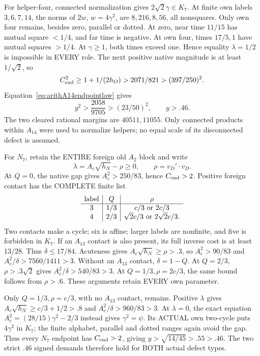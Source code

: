 \documentclass[11pt]{article}
\begin{document}
For helper-four, connected normalization
gives \(2\sqrt2\gamma\in K_7\).
At finite own labels \(3,6,7,14\), the
norms of \(2w\), \(w=4\gamma^2\), are
\(8,216,8,56\), all nonsquares.
Only own four remains, besides zero,
parallel or dotted.
At zero, near time \(11/15\) has mutual
square \(<1/4\), and far time is negative.
At own four, times \(17/5,1\) have mutual
squares \(>1/4\).
At \(\gamma\ge1\), both times exceed one.
Hence equality \(\lambda=1/2\) is impossible
in EVERY role.
The next positive native magnitude is
at least \(1/\sqrt2\), so
\[
 C_{\rm end}^2\ge1+1/(2h_O)>2071/821>(397/250)^2 .
\]
Equation~\eqref{eq:arithA14endpointlaw} gives
\[
                       y^2>{\frac{2058}{9705}}>(23/50)^2,\qquad y>.46 .
\]
The two cleared rational margins are
\(40511,11055\).
Only connected products within \(A_{14}\)
were used to normalize helpers; no equal
scale of its disconnected defect is assumed.

For \(N_7\), retain the ENTIRE foreign
old \(A_2\) block and write
\[
 \lambda=A_c\sqrt{h_N}-\rho\ge0,\qquad
                              \rho=v_D'\cdot v_D .
\]
At \(Q=0\), the native gap gives
\(A_c^2>250/83\), hence \(C_{\rm end}>2\).
Positive foreign contact has the COMPLETE
finite list
\[
 \begin{array}{c|c|c}
 \text{label}&Q&\rho\\ \hline
 3&1/3&c/3\ \hbox{or }2c/3\\
 4&2/3&\sqrt2c/3\ \hbox{or }2\sqrt2c/3 .
 \end{array}
\]
Two contacts make a cycle; six is affine;
larger labels are nonfinite, and five is
forbidden in \(K_7\).
If an \(A_{13}\) contact is also present,
its full inverse cost is at least \(13/28\).
Thus \(\delta\le17/84\).
Acuteness gives \(A_c\sqrt{h_N}\ge\rho>.3\),
so \(A_c^2>90/83\) and
\(A_c^2/\delta>7560/1411>3\).
Without an \(A_{13}\) contact, \(\delta=1-Q\).
At \(Q=2/3\), \(\rho>.3\sqrt2\) gives
\(A_c^2/\delta>540/83>3\).
At \(Q=1/3,\rho=2c/3\), the same bound
follows from \(\rho>.6\).
These arguments retain EVERY own parameter.

Only \(Q=1/3,\rho=c/3\), with no
\(A_{13}\) contact, remains.
Positive \(\lambda\) gives
\(A_c\sqrt{h_N}\ge c/3+1/2>.8\)
and \(A_c^2/\delta>960/83>3\).
At \(\lambda=0\), the exact equation
\(A_c^2=(28/15)\gamma^2-2/3\) instead gives
\(\gamma^2=\psi\).
Its ACTUAL own two-cycle puts
\(4\gamma^2\) in \(K_7\);
the finite alphabet, parallel and dotted
ranges again avoid the gap.
Thus every \(N_7\) endpoint has \(C_{\rm end}>2\),
giving \(y>\sqrt{14/45}>.55>.46\).
The two strict \(.46\) signed demands
therefore hold for BOTH actual defect types.
\end{document}
